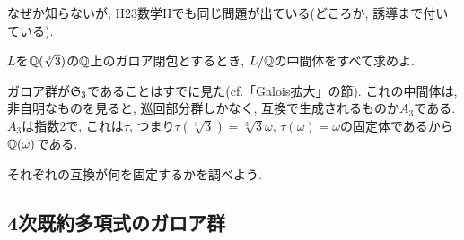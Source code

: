 \begin{rem}
なぜか知らないが, H23数学IIでも同じ問題が出ている(どころか, 誘導まで付いている).
\end{rem}









\begin{egprob}
$L$を$\mathbb{Q}(\sqrt[3]{3})$の$\mathbb{Q}$上のガロア閉包とするとき, $L/\mathbb{Q}$の中間体をすべて求めよ.
\end{egprob}
\begin{egans}
ガロア群が$\mathfrak{S}_{3}$であることはすでに見た(cf.「Galois拡大」の節). これの中間体は, 非自明なものを見ると, 巡回部分群しかなく, 互換で生成されるものか$A_3$である. $A_3$は指数2で, これは$\tau$, つまり$\tau(\sqrt[3]{3}) = \sqrt[3]{3}\omega$, $\tau(\omega) = \omega$の固定体であるから$\mathbb{Q}(\omega)$である. \par
それぞれの互換が何を固定するかを調べよう. %
\end{egans}








\subsection{4次既約多項式のガロア群}

